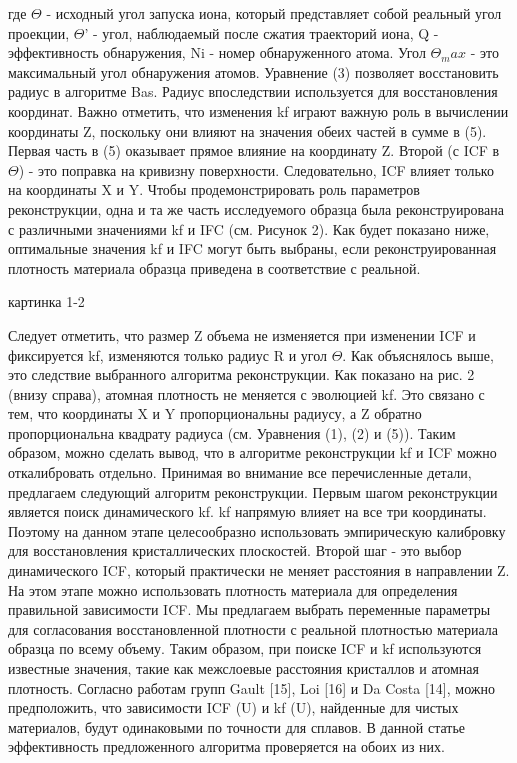 где $\Theta$ - исходный угол запуска иона, который представляет собой реальный угол проекции, $\Theta$' - угол, наблюдаемый после сжатия траекторий иона, Q - эффективность обнаружения, Ni - номер обнаруженного атома. Угол $\Theta_max$ - это максимальный угол обнаружения атомов. Уравнение (3) позволяет восстановить радиус в алгоритме Bas. Радиус впоследствии используется для восстановления координат. Важно отметить, что изменения kf играют важную роль в вычислении координаты Z, поскольку они влияют на значения обеих частей в сумме в (5). Первая часть в (5) оказывает прямое влияние на координату Z. Второй (с ICF в $\Theta$) - это поправка на кривизну поверхности. Следовательно, ICF влияет только на координаты X и Y. Чтобы продемонстрировать роль параметров реконструкции, одна и та же часть исследуемого образца была реконструирована с различными значениями kf и IFC (см. Рисунок 2). Как будет показано ниже, оптимальные значения kf и IFC могут быть выбраны, если реконструированная плотность материала образца приведена в соответствие с реальной.

картинка 1-2

Следует отметить, что размер Z объема не изменяется при изменении ICF и фиксируется kf, изменяются только радиус R и угол $\Theta$. Как объяснялось выше, это следствие выбранного алгоритма реконструкции. Как показано на рис. 2 (внизу справа), атомная плотность не меняется с эволюцией kf. Это связано с тем, что координаты X и Y пропорциональны радиусу, а Z обратно пропорциональна квадрату радиуса (см. Уравнения (1), (2) и (5)). Таким образом, можно сделать вывод, что в алгоритме реконструкции kf и ICF можно откалибровать отдельно.
Принимая во внимание все перечисленные детали, предлагаем следующий алгоритм реконструкции. Первым шагом реконструкции является поиск динамического kf. kf напрямую влияет на все три координаты. Поэтому на данном этапе целесообразно использовать эмпирическую калибровку для восстановления кристаллических плоскостей. Второй шаг - это выбор динамического ICF, который практически не меняет расстояния в направлении Z. На этом этапе можно использовать плотность материала для определения правильной зависимости ICF. Мы предлагаем выбрать переменные параметры для согласования восстановленной плотности с реальной плотностью материала образца по всему объему.
Таким образом, при поиске ICF и kf используются известные значения, такие как межслоевые расстояния кристаллов и атомная плотность. Согласно работам групп Gault [15], Loi [16] и Da Costa [14], можно предположить, что зависимости ICF (U) и kf (U), найденные для чистых материалов, будут одинаковыми по точности для сплавов. В данной статье эффективность предложенного алгоритма проверяется на обоих из них.


